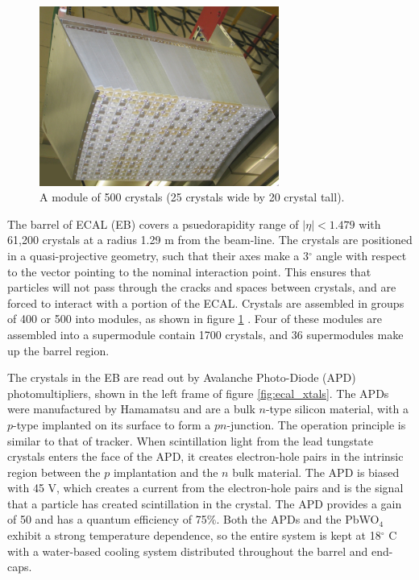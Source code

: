 \begin{figure}[h]
   \centering
  \includegraphics[width=0.7\textwidth]{Figures/CMS_Diagrams/ECAL__Xtal_Module.pdf}
  \caption{A module of 500 crystals (25 crystals wide by 20 crystal tall). } \label{fig:ecal_xtal_module}
\end{figure}

\par The barrel of ECAL (EB) covers a psuedorapidity range of
$|\eta|<1.479$ with 61,200 crystals at a radius 1.29 m from the
beam-line.  The crystals are positioned in a quasi-projective geometry,
such that their axes make a 3$^{\circ}$ angle with respect to the
vector pointing to the nominal interaction point.  This ensures that
particles will not pass through the cracks and spaces between crystals,
and are forced to interact with a portion of the ECAL. Crystals are
assembled in groups of 400 or 500 into modules, as shown in figure
\ref{fig:ecal_xtal_module} .  Four of these modules are assembled into
a supermodule contain 1700 crystals, and 36 supermodules make up the
barrel region. 

\par The crystals in the EB are read out by Avalanche Photo-Diode (APD)
photomultipliers, shown in the left frame of figure
\ref{fig:ecal_xtals}.  The APDs were manufactured by Hamamatsu and are
a bulk $n$-type silicon material, with a $p$-type implanted on its
surface to form a $pn$-junction.  The operation principle is similar
to that of tracker.  When scintillation light from the lead tungstate
crystals enters the face of the APD, it creates electron-hole pairs in
the intrinsic region between the $p$ implantation and the $n$ bulk
material.  The APD is biased with 45 V, which creates a current from
the electron-hole pairs and is the signal that a particle has created
scintillation in the crystal.  The APD provides a gain of 50 and has a
quantum efficiency of 75$\%$.  Both the APDs and the PbWO$_{4}$
exhibit a strong temperature dependence, so the entire system is kept
at 18$^{\circ}$ C with a water-based cooling system distributed
throughout the barrel and end-caps.  

